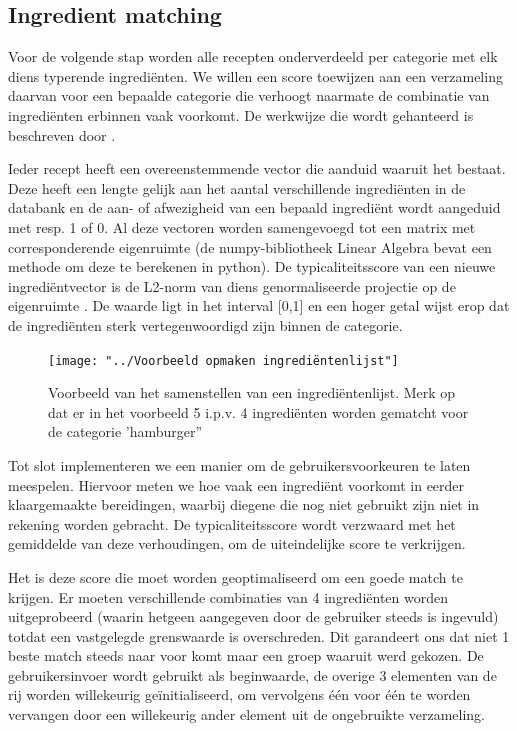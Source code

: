 \documentclass{hogent-article}
\begin{document}
\subsection{Ingredient matching}%

Voor de volgende stap worden alle recepten onderverdeeld per categorie met elk diens typerende ingrediënten. We willen een score toewijzen aan een verzameling daarvan voor een bepaalde categorie die verhoogt naarmate de combinatie van ingrediënten erbinnen vaak voorkomt. De werkwijze die wordt gehanteerd is beschreven door \textcite{Yokoi2015}.

Ieder recept heeft een overeenstemmende vector die aanduid waaruit het bestaat. Deze heeft een lengte gelijk aan het aantal verschillende ingrediënten in de databank en de aan- of afwezigheid van een bepaald ingrediënt wordt aangeduid met resp. 1 of 0. Al deze vectoren worden samengevoegd tot een matrix met  corresponderende eigenruimte (de numpy-bibliotheek Linear Algebra bevat een methode om deze te berekenen in python). De typicaliteitsscore van een nieuwe ingrediëntvector  \autocite{Yokoi2015} is de L2-norm van diens genormaliseerde projectie op de eigenruimte \autocite{Karabiber}. De waarde ligt in het interval [0,1] en een hoger getal wijst erop dat de ingrediënten sterk vertegenwoordigd zijn binnen de categorie.

\begin{figure}
    \centering
    \texttt{[image: "../Voorbeeld opmaken ingrediëntenlijst"]}
    \caption[Voorbeeld van het samenstellen van een ingrediëntenlijst]{Voorbeeld van het samenstellen van een ingrediëntenlijst. Merk op dat er in het voorbeeld 5 i.p.v. 4 ingrediënten worden gematcht voor de categorie 'hamburger'' \autocite{Yokoi2015}}
    \label{fig:voorbeeld-opmaken-ingredientenlijst}
\end{figure}

Tot slot implementeren we een manier om de gebruikersvoorkeuren te laten meespelen. Hiervoor meten we hoe vaak een ingrediënt voorkomt in eerder klaargemaakte bereidingen, waarbij diegene die nog niet gebruikt zijn niet in rekening worden gebracht. De typicaliteitsscore wordt verzwaard met het gemiddelde van deze verhoudingen, om de uiteindelijke score te verkrijgen.

Het is deze score die moet worden geoptimaliseerd om een goede match te krijgen. Er moeten verschillende combinaties van 4 ingrediënten worden uitgeprobeerd (waarin hetgeen aangegeven door de gebruiker steeds is ingevuld) totdat een vastgelegde grenswaarde is overschreden. Dit garandeert ons dat niet 1 beste match steeds naar voor komt maar een groep waaruit werd gekozen. De gebruikersinvoer wordt gebruikt als beginwaarde, de overige 3 elementen van de rij worden willekeurig geïnitialiseerd, om vervolgens één voor één te worden vervangen door een willekeurig ander element uit de ongebruikte verzameling. 
\end{document}
